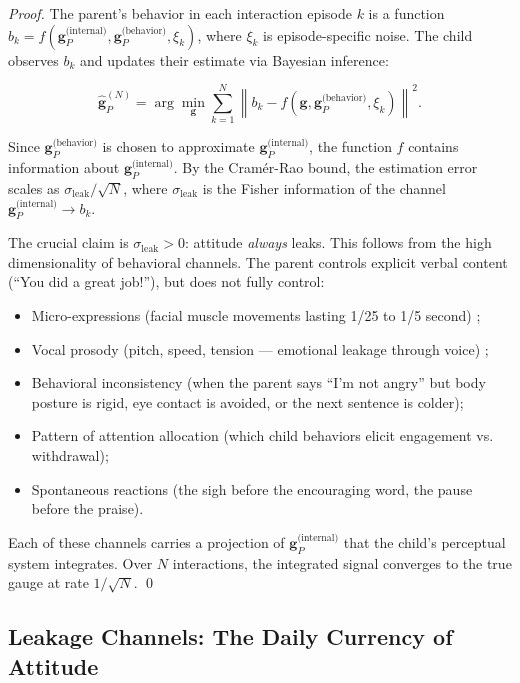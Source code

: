 \documentclass[11pt,a4paper]{article}
\newcommand{\norm}[1]{\left\lVert#1\right\rVert}
\begin{document}
\begin{proof}
The parent's behavior in each interaction episode $k$ is a function $b_k = f(\mathbf{g}_P^{\text{(internal)}}, \mathbf{g}_P^{\text{(behavior)}}, \xi_k)$, where $\xi_k$ is episode-specific noise. The child observes $b_k$ and updates their estimate via Bayesian inference:

\begin{equation}
    \hat{\mathbf{g}}_P^{(N)} = \arg\min_{\mathbf{g}} \sum_{k=1}^N \norm{b_k - f(\mathbf{g}, \mathbf{g}_P^{\text{(behavior)}}, \xi_k)}^2.
\end{equation}

Since $\mathbf{g}_P^{\text{(behavior)}}$ is chosen to approximate $\mathbf{g}_P^{\text{(internal)}}$, the function $f$ contains information about $\mathbf{g}_P^{\text{(internal)}}$. By the Cram\'{e}r-Rao bound, the estimation error scales as $\sigma_{\text{leak}} / \sqrt{N}$, where $\sigma_{\text{leak}}$ is the Fisher information of the channel $\mathbf{g}_P^{\text{(internal)}} \to b_k$.

The crucial claim is $\sigma_{\text{leak}} > 0$: attitude \textit{always} leaks. This follows from the high dimensionality of behavioral channels. The parent controls explicit verbal content (``You did a great job!''), but does not fully control:
\begin{itemize}
    \item Micro-expressions (facial muscle movements lasting 1/25 to 1/5 second) \cite{ekman2003emotions};
    \item Vocal prosody (pitch, speed, tension — emotional leakage through voice) \cite{scherer2003vocal};
    \item Behavioral inconsistency (when the parent says ``I'm not angry'' but body posture is rigid, eye contact is avoided, or the next sentence is colder);
    \item Pattern of attention allocation (which child behaviors elicit engagement vs. withdrawal);
    \item Spontaneous reactions (the sigh before the encouraging word, the pause before the praise).
\end{itemize}

Each of these channels carries a projection of $\mathbf{g}_P^{\text{(internal)}}$ that the child's perceptual system integrates. Over $N$ interactions, the integrated signal converges to the true gauge at rate $1/\sqrt{N}$. \qed
\end{proof}

\subsection{Leakage Channels: The Daily Currency of Attitude}
\end{document}
